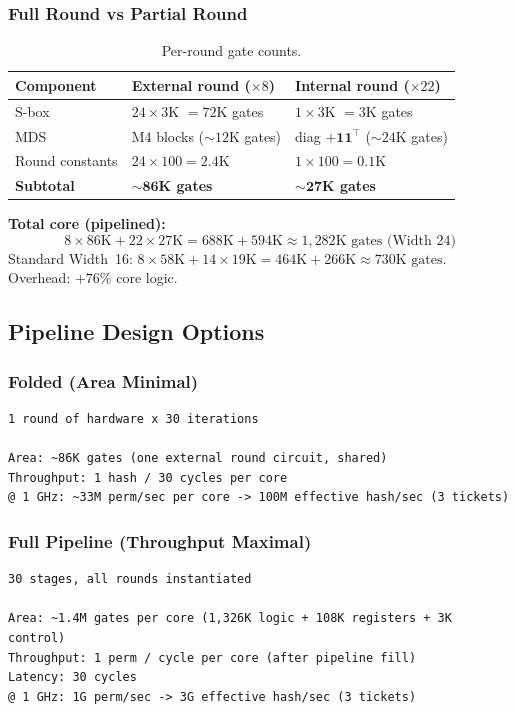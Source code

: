 \documentclass[11pt,a4paper]{article}
\begin{document}
\subsubsection{Full Round vs Partial Round}

\begin{table}[h]
\centering
\begin{tabular}{@{}lll@{}}
\toprule
Component & External round ($\times 8$) & Internal round ($\times 22$) \\
\midrule
S-box & $24 \times 3$K $= 72$K gates & $1 \times 3$K $= 3$K gates \\
MDS & M4 blocks (${\sim}12$K gates) & diag $+ \mathbf{1}\mathbf{1}^\top$ (${\sim}24$K gates) \\
Round constants & $24 \times 100 = 2.4$K & $1 \times 100 = 0.1$K \\
\textbf{Subtotal} & $\mathbf{{\sim}86}$\textbf{K gates} & $\mathbf{{\sim}27}$\textbf{K gates} \\
\bottomrule
\end{tabular}
\caption{Per-round gate counts.}
\label{tab:rounds}
\end{table}

\textbf{Total core (pipelined):}
\[
8 \times 86\text{K} + 22 \times 27\text{K} = 688\text{K} + 594\text{K} \approx 1{,}282\text{K gates (Width 24)}
\]
Standard Width~16: $8 \times 58\text{K} + 14 \times 19\text{K} = 464\text{K} + 266\text{K} \approx 730\text{K gates}$. Overhead: $+76\%$ core logic.

\subsection{Pipeline Design Options}

\subsubsection{Folded (Area Minimal)}
\begin{Verbatim}[fontsize=\small]
1 round of hardware x 30 iterations

Area: ~86K gates (one external round circuit, shared)
Throughput: 1 hash / 30 cycles per core
@ 1 GHz: ~33M perm/sec per core -> 100M effective hash/sec (3 tickets)
\end{Verbatim}

\subsubsection{Full Pipeline (Throughput Maximal)}
\begin{Verbatim}[fontsize=\small]
30 stages, all rounds instantiated

Area: ~1.4M gates per core (1,326K logic + 108K registers + 3K control)
Throughput: 1 perm / cycle per core (after pipeline fill)
Latency: 30 cycles
@ 1 GHz: 1G perm/sec -> 3G effective hash/sec (3 tickets)
\end{Verbatim}
\end{document}
